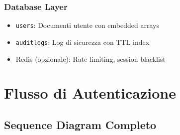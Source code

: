 \documentclass[12pt,a4paper]{report}
\begin{document}
\subsection{Database Layer}

\begin{infobox}
\begin{itemize}
    \item \texttt{users}: Documenti utente con embedded arrays
    \item \texttt{auditlogs}: Log di sicurezza con TTL index
    \item Redis (opzionale): Rate limiting, session blacklist
\end{itemize}
\end{infobox}

\chapter{Flusso di Autenticazione}

\section{Sequence Diagram Completo}
\end{document}
